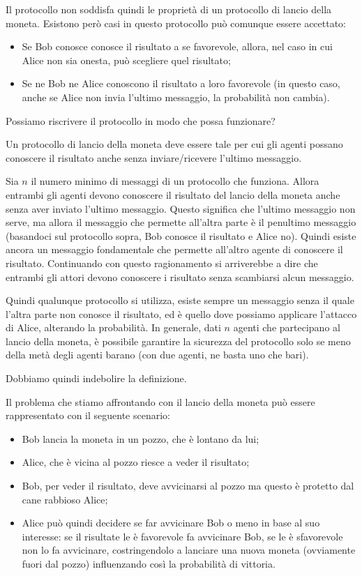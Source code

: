 \noindent Il protocollo non soddisfa quindi le proprietà di un protocollo di lancio della moneta. Esistono però casi in questo protocollo può comunque essere accettato:
\begin{itemize}
    \item Se Bob conosce conosce il risultato a se favorevole, allora, nel caso in cui Alice non sia onesta, può scegliere quel risultato;
    \item Se ne Bob ne Alice conoscono il risultato a loro favorevole (in questo caso, anche se Alice non invia l'ultimo messaggio, la probabilità non cambia).
\end{itemize}

\noindent Possiamo riscrivere il protocollo in modo che possa funzionare? 
\begin{definition}
Un protocollo di lancio della moneta deve essere tale per cui gli agenti possano conoscere il risultato anche senza inviare/ricevere l'ultimo messaggio.
\end{definition}

\noindent Sia $n$ il numero minimo di messaggi di un protocollo che funziona. Allora entrambi gli agenti devono conoscere il risultato del lancio della moneta anche senza aver inviato l'ultimo messaggio. Questo significa che l'ultimo messaggio non serve, ma allora il messaggio che permette all'altra parte è il penultimo messaggio (basandoci sul protocollo sopra, Bob conosce il risultato e Alice no). Quindi esiste ancora un messaggio fondamentale che permette all'altro agente di conoscere il risultato. Continuando con questo ragionamento si arriverebbe a dire che entrambi gli attori devono conoscere i risultato senza scambiarsi alcun messaggio.

Quindi qualunque protocollo si utilizza, esiste sempre un messaggio senza il quale l'altra parte non conosce il risultato, ed è quello dove possiamo applicare l'attacco di Alice, alterando la probabilità. In generale, dati $n$ agenti che partecipano al lancio della moneta, è possibile garantire la sicurezza del protocollo solo se meno della metà degli agenti barano (con due agenti, ne basta uno che bari).

Dobbiamo quindi indebolire la definizione.

\noindent Il problema che stiamo affrontando con il lancio della moneta può essere rappresentato con il seguente scenario:
\begin{itemize}
    \item Bob lancia la moneta in un pozzo, che è lontano da lui;
    \item Alice, che è vicina al pozzo riesce a veder il risultato;
    \item Bob, per veder il risultato, deve avvicinarsi al pozzo ma questo è protetto dal cane rabbioso Alice;
    \item Alice può quindi decidere se far avvicinare Bob o meno in base al suo interesse: se il risultate le è favorevole fa avvicinare Bob, se le è sfavorevole non lo fa avvicinare, costringendolo a lanciare una nuova moneta (ovviamente fuori dal pozzo) influenzando così la probabilità di vittoria.
\end{itemize}

